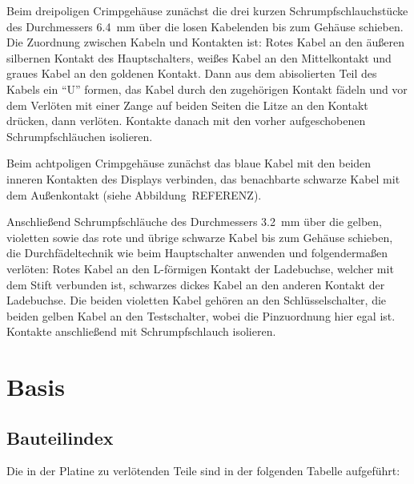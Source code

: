 \documentclass[paper=a4, open=any, numbers=noenddot]{scrbook}
\begin{document}
				Beim dreipoligen Crimpgehäuse zunächst die drei kurzen Schrumpfschlauchstücke des Durchmessers \SI{6,4}{\milli\metre} über die losen Kabelenden bis zum Gehäuse schieben. Die Zuordnung zwischen Kabeln und Kontakten ist: Rotes Kabel an den äußeren silbernen Kontakt des Hauptschalters, weißes Kabel an den Mittelkontakt und graues Kabel an den goldenen Kontakt. Dann aus dem abisolierten Teil des Kabels ein \enquote{U} formen, das Kabel durch den zugehörigen Kontakt fädeln und vor dem Verlöten mit einer Zange auf beiden Seiten die Litze an den Kontakt drücken, dann verlöten. Kontakte danach mit den vorher aufgeschobenen Schrumpfschläuchen isolieren.

				Beim achtpoligen Crimpgehäuse zunächst das blaue Kabel mit den beiden inneren Kontakten des Displays verbinden, das benachbarte schwarze Kabel mit dem Außenkontakt (siehe Abbildung~REFERENZ).
				
				Anschließend Schrumpfschläuche des Durchmessers \SI{3,2}{\milli\metre} über die gelben, violetten sowie das rote und übrige schwarze Kabel bis zum Gehäuse schieben, die Durchfädeltechnik wie beim Hauptschalter anwenden und folgendermaßen verlöten: Rotes Kabel an den L-förmigen Kontakt der Ladebuchse, welcher mit dem Stift verbunden ist, schwarzes dickes Kabel an den anderen Kontakt der Ladebuchse. Die beiden violetten Kabel gehören an den Schlüsselschalter, die beiden gelben Kabel an den Testschalter, wobei die Pinzuordnung hier egal ist. Kontakte anschließend mit Schrumpfschlauch isolieren.

				

				\newpage
		\section{Basis}
			\subsection*{Bauteilindex}

				Die in der Platine zu verlötenden Teile sind in der folgenden Tabelle aufgeführt:
\end{document}
